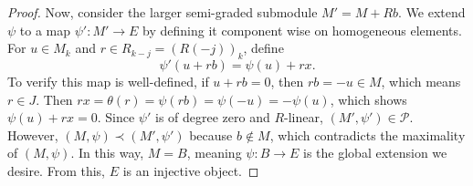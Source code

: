 \documentclass[10pt,a4paper]{amsart}
\begin{document}
\begin{proof}
Now, consider the larger semi-graded submodule $M' = M + R b$. We extend $\psi$ to a map $\psi': M' \to E$ by defining it component wise on homogeneous elements. For $u \in M_k$ and $r \in R_{k-j} = (R(-j))_k$, define 
\[
\psi'(u + r b) = \psi(u) + r x.
\]
To verify this map is well-defined, if $u + r b = 0$, then $r b = -u \in M$, which means $r \in J$. Then $r x = \theta(r) = \psi(r b) = \psi(-u) = -\psi(u)$, which shows $\psi(u) + r x = 0$. Since $\psi'$ is of degree zero and $R$-linear, $(M', \psi') \in \mathcal{P}$. However, $(M, \psi) \prec (M', \psi')$ because $b \notin M$, which contradicts the maximality of $(M, \psi)$. In this way, $M = B$, meaning $\psi: B \to E$ is the global extension we desire. From this, $E$ is an injective object.
\end{proof}
\end{document}
